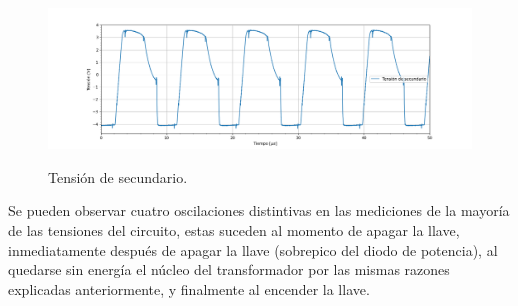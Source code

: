 \begin{figure}[H]
	\centering
	\includegraphics[width=0.9\linewidth]{ImagenesParteIV/Vsec.png}
	\label{fig:vsec_4}
	\caption{Tensión de secundario.}
\end{figure}
Se pueden observar cuatro oscilaciones distintivas en las mediciones de la mayoría de las tensiones del circuito, estas suceden al momento de apagar la llave, inmediatamente después de apagar la llave (sobrepico del diodo de potencia), al quedarse sin energía el núcleo del transformador por las mismas razones explicadas anteriormente, y finalmente al encender la llave.
%